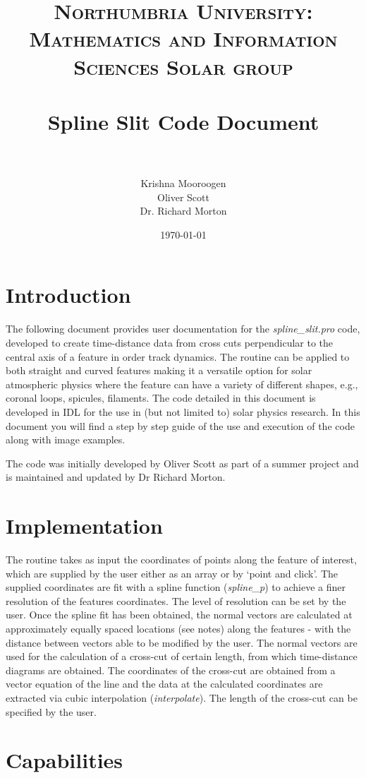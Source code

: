 \documentclass[11pt]{article}
\title{	
\normalfont \normalsize 
\textsc{Northumbria University: Mathematics and Information Sciences Solar group} \\ [25pt] %
\horrule{0.5pt} \\[0.4cm] %
\huge Spline Slit Code Document \\ %
\horrule{2pt} \\[0.5cm] %
}
\author{Krishna Mooroogen\\Oliver Scott\\Dr. Richard Morton} %
\date{\normalsize\today} %
\begin{document}
\maketitle %
\newpage
\section{Introduction}
The following document provides user documentation for the \textit{spline\_slit.pro} code, developed to create time-distance data from cross cuts perpendicular to the central axis of a feature in order track dynamics. The routine can be applied to both straight and curved features making it a versatile option for solar atmospheric physics where the feature can have a variety of different shapes, e.g., coronal loops, spicules, filaments. The code detailed in this document is developed in IDL for the use in (but not limited to) solar physics research. In this document you will find a step by step guide of the use and execution of the code along with image examples.



The code was initially developed by Oliver Scott as part of a summer project and is maintained and updated by Dr Richard Morton. 

\section{Implementation}

The routine takes as input the coordinates of points along the feature of interest, which are supplied by the user either as an array or by `point and click'. The supplied coordinates are fit with a spline function (\textit{spline\_p}) to achieve a finer resolution of the features coordinates. The level of resolution can be set by the user. Once the spline fit has been obtained, the normal vectors are calculated at approximately equally spaced locations (see notes) along the features - with the distance between vectors able to be modified by the user. The normal vectors are used for the calculation of a cross-cut of certain length, from which time-distance diagrams are obtained. The coordinates of the cross-cut are obtained from a vector equation of the line and the data at the calculated coordinates are extracted via cubic interpolation (\textit{interpolate}). The length of the cross-cut can be specified by the user. 

\section{Capabilities}
\end{document}
